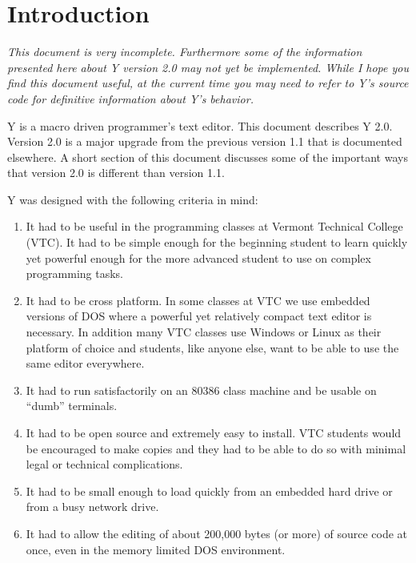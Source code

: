 \chapter{Introduction}

\textit{This document is very incomplete. Furthermore some of the information presented here
  about Y version 2.0 may not yet be implemented. While I hope you find this document useful, at
  the current time you may need to refer to Y's source code for definitive information about Y's
  behavior.}

Y is a macro driven programmer's text editor. This document describes Y 2.0. Version 2.0 is a
major upgrade from the previous version 1.1 that is documented elsewhere. A short section of
this document discusses some of the important ways that version 2.0 is different than version
1.1.

Y was designed with the following criteria in mind:

\begin{enumerate}

\item It had to be useful in the programming classes at Vermont Technical College (VTC). It had
  to be simple enough for the beginning student to learn quickly yet powerful enough for the
  more advanced student to use on complex programming tasks.

\item It had to be cross platform. In some classes at VTC we use embedded versions of DOS where
  a powerful yet relatively compact text editor is necessary. In addition many VTC classes use
  Windows or Linux as their platform of choice and students, like anyone else, want to be able
  to use the same editor everywhere.

\item It had to run satisfactorily on an 80386 class machine and be usable on ``dumb''
  terminals.

\item It had to be open source and extremely easy to install. VTC students would be encouraged
  to make copies and they had to be able to do so with minimal legal or technical complications.

\item It had to be small enough to load quickly from an embedded hard drive or from a busy
  network drive.

\item It had to allow the editing of about 200,000 bytes (or more) of source code at once, even
  in the memory limited DOS environment.

\end{enumerate}


